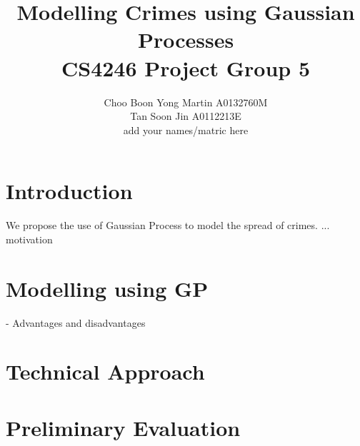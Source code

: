 \documentclass{article}
\title{Modelling Crimes using Gaussian Processes \\ \large CS4246 Project Group 5}
\author{Choo Boon Yong Martin A0132760M \\
Tan Soon Jin A0112213E \\ 
add your names/matric here}
\begin{document}
\maketitle

\section{Introduction}
We propose the use of Gaussian Process to model the spread of crimes.
...
motivation

\section{Modelling using GP}
- Advantages and disadvantages

\section{Technical Approach}

\section{Preliminary Evaluation}
\end{document}
